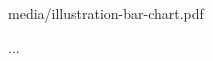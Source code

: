 \begin{besidefigure}[height=4.2cm, border]
		{media/illustration-bar-chart.pdf}
	\begin{itemize} ... \end{itemize}
\end{besidefigure}

